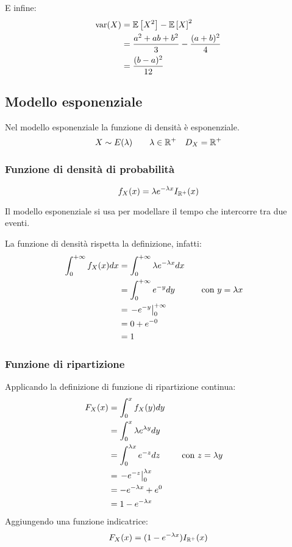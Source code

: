 E infine:
\begin{align*}
	\operatorname{var}(X) & = \mathbb{E}\left[ X^2 \right] - \mathbb{E}\left[ X \right]^2                      \\
	        & = \frac{a^2+ab+b^2}{3} - \frac{(a+b)^2}{4} \\
	        & = \frac{(b-a)^2}{12}
\end{align*}


\subsection{Modello esponenziale}
Nel modello esponenziale la funzione di densità è esponenziale.
\begin{equation*}
	X\sim E(\lambda) \qquad \lambda\in\mathbb R^+ \quad D_X=\mathbb R^+
\end{equation*}


\subsubsection{Funzione di densità di probabilità}
\begin{equation*}
	f_X(x) = \lambda e^{-\lambda x} I_{\mathbb R^+}(x)
\end{equation*}

Il modello esponenziale si usa per modellare il tempo che intercorre tra due eventi.

La funzione di densità rispetta la definizione, infatti:
\begin{align*}
	\int_0^{+\infty} f_X(x)dx & = \int_0^{+\infty} \lambda e^{-\lambda x} dx       \\
	                          & = \int_0^{+\infty} e^{-y}dy & \quad & \text{con $y=\lambda x$} \\
	                          & = \left. -e^{-y} \right\rvert_{0}^{+\infty}                       \\
	                          & = 0 + e^{-0}                                       \\
	                          & = 1
\end{align*}


\subsubsection{Funzione di ripartizione}
Applicando la definizione di funzione di ripartizione continua:
\begin{align*}
	F_X(x) & = \int_0^x f_X(y)dy                                  \\
	       & = \int_0^x \lambda e^{\lambda y}dy                   \\
	       & = \int_0^{\lambda x} e^{-z}dz & \quad & \text{con $z=\lambda y$} \\
	       & = \left. -e^{-z} \right\rvert_{0}^{\lambda x}                       \\
	       & = -e^{-\lambda x} + e^0                              \\
	       & = 1-e^{-\lambda x}
\end{align*}
Aggiungendo una funzione indicatrice:
\begin{equation}
	F_X(x) = (1 - e^{-\lambda x})I_{\mathbb R^+}(x)
\end{equation}


